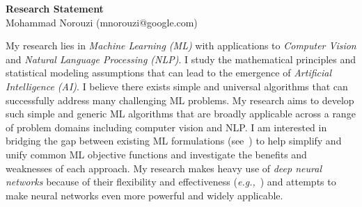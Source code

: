\documentclass[a4paper, 10pt]{article}
\def\eg{{\em e.g.,}}
\begin{document}
\thispagestyle{fancy}
\lhead{}
\rhead{}
\renewcommand{\headrulewidth}{0pt} 
\renewcommand{\footrulewidth}{0pt} 


\pagestyle{fancy}
\lhead{\textcolor{gray}{\it Mohammad Norouzi}}
\rhead{\textcolor{gray}{\thepage/\totalpages{}}}


\begin{center}
{\LARGE \bf Research Statement}\\
\vspace*{0.1cm}
{\normalsize Mohammad Norouzi (mnorouzi@google.com)}
\vspace*{0.2cm}
\end{center}




My research lies in {\em Machine Learning (ML)} with applications to
{\em Computer Vision} and {\em Natural Language Processing (NLP)}. I
study the mathematical principles and statistical modeling assumptions
that can lead to the emergence of {\em Artificial Intelligence (AI)}.
I believe there exists simple and universal algorithms that can
successfully address many challenging ML problems. My research aims to
develop such simple and generic ML algorithms that are broadly
applicable across a range of problem domains including computer vision
and NLP. I am interested in bridging the gap between existing ML
formulations (see~\cite{raml,pcl}) to help simplify and unify common
ML objective functions and investigate the benefits and weaknesses of
each approach. My research makes heavy use of {\em deep neural
  networks} because of their flexibility and effectiveness
(\eg~\cite{seq2seq,alphago}) and attempts to make neural networks even
more powerful and widely applicable.
\end{document}
